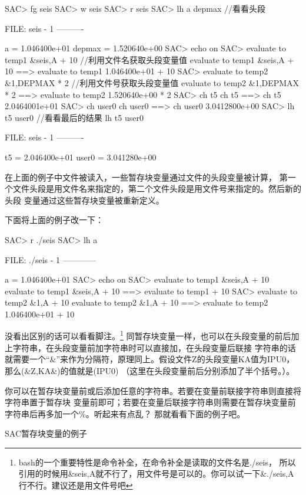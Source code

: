 \begin{SACCode}
SAC> fg seis
SAC> w seis
SAC> r seis
SAC> lh a depmax                            //看看头段
   
  FILE: seis - 1
 ----------

          a = 1.046400e+01
     depmax = 1.520640e+00
SAC> echo on
SAC> evaluate to temp1 &seis,A + 10         //利用文件名获取头段变量值
 evaluate to temp1 &seis,A + 10
 ==> evaluate to temp1 1.046400e+01 + 10
SAC> evaluate to temp2 &1,DEPMAX * 2        //利用文件号获取头段变量值
 evaluate to temp2 &1,DEPMAX * 2
 ==> evaluate to temp2 1.520640e+00 * 2
SAC> ch t5 %
 ch t5 %
 ==> ch t5 2.0464001e+01
SAC> ch user0 %
 ch user0 %
 ==> ch user0 3.0412800e+00
SAC> lh t5 user0                            //看看最后的结果
 lh t5 user0
  
  FILE: seis - 1
 ----------

        t5 = 2.046400e+01
     user0 = 3.041280e+00
\end{SACCode}
在上面的例子中文件被读入，一些暂存块变量通过文件的头段变量被计算，
第一个文件头段是用文件名来指定的，第二个文件头段是用文件号来指定的。然后新的头段
变量通过这些暂存块变量被重新定义。

下面将上面的例子改一下：
\begin{SACCode}
SAC> r ./seis 
SAC> lh a 
  
  FILE: ./seis - 1
 ------------

     a = 1.046400e+01
SAC> echo on
SAC> evaluate to temp1 &seis,A + 10
 evaluate to temp1 &seis,A + 10
 ==> evaluate to temp1  + 10
SAC> evaluate to temp2 &1,A + 10
 evaluate to temp2 &1,A + 10
 ==> evaluate to temp2 1.046400e+01 + 10
\end{SACCode}
没看出区别的话可以看看脚注。\footnote{bash的一个重要特性是命令补全，在命令补全是读取的文件名是./seis，
所以引用的时候用\&seis,A就不行了，用文件号是可以的。你可以试一下\&./seis,A行不行。建议还是用文件号吧}
同暂存块变量一样，也可以在头段变量的前后加上字符串，在头段变量前加字符串时可以直接加，在头段变量后联接
字符串的话就需要一个``\&''来作为分隔符，原理同上。假设文件Z的头段变量KA值为IPU0，那么(\&Z,KA\&)的值就是(IPU0)
（这里在头段变量前后分别添加了半个括号。）。


你可以在暂存块变量前或后添加任意的字符串。若要在变量前联接字符串则直接将字符串置于暂存块
变量前即可；若要在变量后联接字符串则需要在暂存块变量前字符串后再多加一个\%。听起来有点乱？
那就看看下面的例子吧。

SAC暂存块变量的例子

